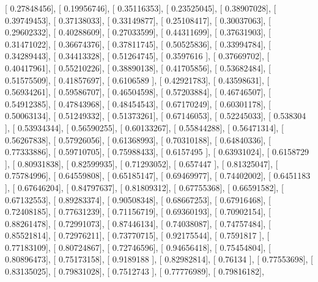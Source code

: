 \documentclass{article}
\begin{document}
       [ 0.27848456],
       [ 0.19956746],
       [ 0.35116353],
       [ 0.23525045],
       [ 0.38907028],
       [ 0.39749453],
       [ 0.37138033],
       [ 0.33149877],
       [ 0.25108417],
       [ 0.30037063],
       [ 0.29602332],
       [ 0.40288609],
       [ 0.27033599],
       [ 0.44311699],
       [ 0.37631903],
       [ 0.31471022],
       [ 0.36674376],
       [ 0.37811745],
       [ 0.50525836],
       [ 0.33994784],
       [ 0.34289443],
       [ 0.34413328],
       [ 0.51264745],
       [ 0.3597616 ],
       [ 0.37669702],
       [ 0.40417961],
       [ 0.55210226],
       [ 0.38890138],
       [ 0.41705856],
       [ 0.53682484],
       [ 0.51575509],
       [ 0.41857697],
       [ 0.6106589 ],
       [ 0.42921783],
       [ 0.43598631],
       [ 0.56934261],
       [ 0.59586707],
       [ 0.46504598],
       [ 0.57203884],
       [ 0.46746507],
       [ 0.54912385],
       [ 0.47843968],
       [ 0.48454543],
       [ 0.67170249],
       [ 0.60301178],
       [ 0.50063134],
       [ 0.51249332],
       [ 0.51373261],
       [ 0.67146053],
       [ 0.52245033],
       [ 0.538304  ],
       [ 0.53934344],
       [ 0.56590255],
       [ 0.60133267],
       [ 0.55844288],
       [ 0.56471314],
       [ 0.56267838],
       [ 0.57926056],
       [ 0.61368993],
       [ 0.70310188],
       [ 0.64840336],
       [ 0.77333886],
       [ 0.59710705],
       [ 0.75988433],
       [ 0.6157495 ],
       [ 0.63931024],
       [ 0.6158729 ],
       [ 0.80931838],
       [ 0.82599935],
       [ 0.71293052],
       [ 0.657447  ],
       [ 0.81325047],
       [ 0.75784996],
       [ 0.64559808],
       [ 0.65185147],
       [ 0.69469977],
       [ 0.74402002],
       [ 0.6451183 ],
       [ 0.67646204],
       [ 0.84797637],
       [ 0.81809312],
       [ 0.67755368],
       [ 0.66591582],
       [ 0.67132553],
       [ 0.89283374],
       [ 0.90508348],
       [ 0.68667253],
       [ 0.67916468],
       [ 0.72408185],
       [ 0.77631239],
       [ 0.71156719],
       [ 0.69360193],
       [ 0.70902154],
       [ 0.88261478],
       [ 0.72991073],
       [ 0.87446134],
       [ 0.74038087],
       [ 0.74757484],
       [ 0.85521814],
       [ 0.72976211],
       [ 0.73770715],
       [ 0.92175544],
       [ 0.7591817 ],
       [ 0.77183109],
       [ 0.80724867],
       [ 0.72746596],
       [ 0.94656418],
       [ 0.75454804],
       [ 0.80896473],
       [ 0.75173158],
       [ 0.9189188 ],
       [ 0.82982814],
       [ 0.76134   ],
       [ 0.77553698],
       [ 0.83135025],
       [ 0.79831028],
       [ 0.7512743 ],
       [ 0.77776989],
       [ 0.79816182],
\end{document}

